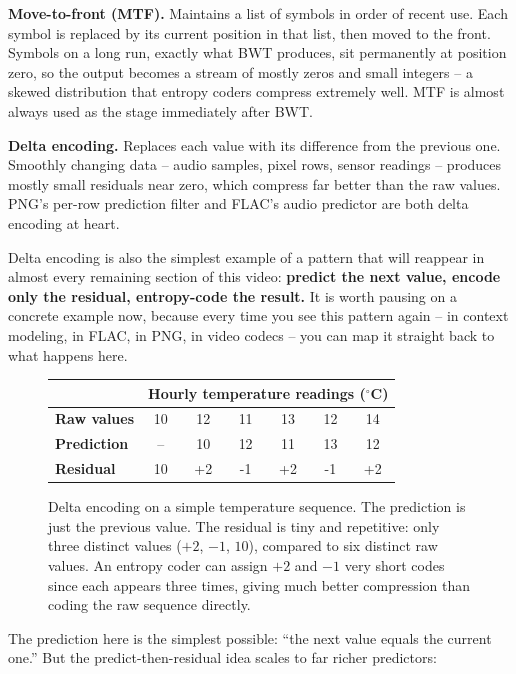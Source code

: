 \documentclass[11pt]{article}
\begin{document}
\textbf{Move-to-front (MTF).} Maintains a list of symbols in order of
recent use. Each symbol is replaced by its current position in that
list, then moved to the front. Symbols on a long run, exactly what BWT
produces, sit permanently at position zero, so the output becomes a
stream of mostly zeros and small integers -- a skewed distribution that
entropy coders compress extremely well. MTF is almost always used as the
stage immediately after BWT.

\textbf{Delta encoding.} Replaces each value with its difference from
the previous one. Smoothly changing data -- audio samples, pixel rows,
sensor readings -- produces mostly small residuals near zero, which
compress far better than the raw values. PNG's per-row prediction filter
and FLAC's audio predictor are both delta encoding at heart.

\medskip
Delta encoding is also the simplest example of a pattern that will
reappear in almost every remaining section of this video:
\textbf{predict the next value, encode only the residual, entropy-code
the result.} It is worth pausing on a concrete example now, because
every time you see this pattern again -- in context modeling, in FLAC,
in PNG, in video codecs -- you can map it straight back to what happens
here.

\begin{figure}[H]
\centering
\begin{tabular}{@{}lcccccc@{}}
\toprule
& \multicolumn{6}{c}{\textbf{Hourly temperature readings ($^\circ$C)}} \\
\midrule
\textbf{Raw values}     & 10 & 12 & 11 & 13 & 12 & 14 \\
\textbf{Prediction}     & -- & 10 & 12 & 11 & 13 & 12 \\
\textbf{Residual}       & 10 & +2 & -1 & +2 & -1 & +2 \\
\bottomrule
\end{tabular}
\caption{Delta encoding on a simple temperature sequence. The
prediction is just the previous value. The residual is tiny and
repetitive: only three distinct values ($+2$, $-1$, $10$), compared to
six distinct raw values. An entropy coder can assign $+2$ and $-1$ very
short codes since each appears three times, giving much better
compression than coding the raw sequence directly.}
\label{fig:delta-example}
\end{figure}

The prediction here is the simplest possible: ``the next value equals
the current one.'' But the predict-then-residual idea scales to far
richer predictors:
\end{document}
